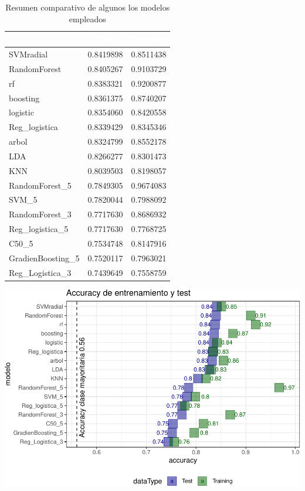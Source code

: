 \documentclass[]{article}
\begin{document}
\begin{table}[!h]

\caption{\label{tab:cuadro_comparativo-modelos}Resumen comparativo de algunos los modelos empleados}
\centering
\begin{tabular}[t]{lrr}
\toprule
\rowcolor{black}  \multicolumn{1}{c}{\textcolor{white}{\textbf{object}}} & \multicolumn{1}{c}{\textcolor{white}{\textbf{Test}}} & \multicolumn{1}{c}{\textcolor{white}{\textbf{Training}}}\\
\midrule
\rowcolor{gray!6}  SVMradial & 0.8419898 & 0.8511438\\
RandomForest & 0.8405267 & 0.9103729\\
\rowcolor{gray!6}  rf & 0.8383321 & 0.9200877\\
boosting & 0.8361375 & 0.8740207\\
\rowcolor{gray!6}  logistic & 0.8354060 & 0.8420558\\
\addlinespace
Reg\_logistica & 0.8339429 & 0.8345346\\
\rowcolor{gray!6}  arbol & 0.8324799 & 0.8552178\\
LDA & 0.8266277 & 0.8301473\\
\rowcolor{gray!6}  KNN & 0.8039503 & 0.8198057\\
RandomForest\_5 & 0.7849305 & 0.9674083\\
\addlinespace
\rowcolor{gray!6}  SVM\_5 & 0.7820044 & 0.7988092\\
RandomForest\_3 & 0.7717630 & 0.8686932\\
\rowcolor{gray!6}  Reg\_logistica\_5 & 0.7717630 & 0.7768725\\
C50\_5 & 0.7534748 & 0.8147916\\
\rowcolor{gray!6}  GradienBoosting\_5 & 0.7520117 & 0.7963021\\
\addlinespace
Reg\_Logistica\_3 & 0.7439649 & 0.7558759\\
\bottomrule
\end{tabular}
\end{table}

\includegraphics{Comparativo_modelos_files/figure-latex/unnamed-chunk-10-1.pdf}
\end{document}
